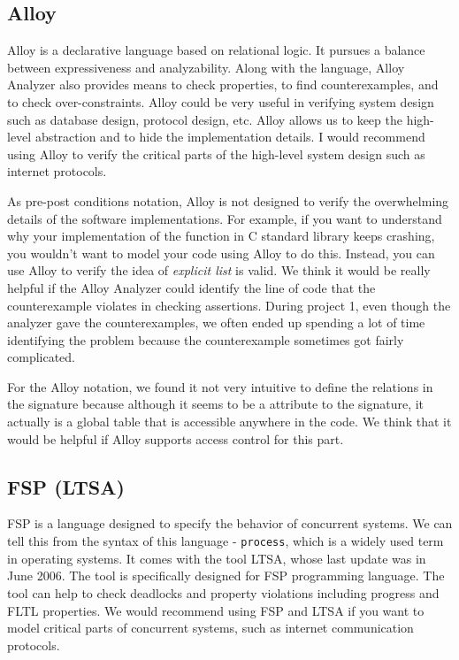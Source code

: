 \documentclass[titlepage]{article}
\begin{document}
\subsection{Alloy}
Alloy is a declarative language based on relational logic. It pursues a balance between expressiveness and analyzability. Along with the language, Alloy Analyzer also provides means to check properties, to find counterexamples, and to check over-constraints. Alloy could be very useful in verifying system design such as database design, protocol design, etc. Alloy allows us to keep the high-level abstraction and to hide the implementation details. I would recommend using Alloy to verify the critical parts of the high-level system design such as internet protocols.

As pre-post conditions notation, Alloy is not designed to verify the overwhelming details of the software implementations. For example, if you want to understand why your implementation of the  function in C standard library keeps crashing, you wouldn't want to model your code using Alloy to do this. Instead, you can use Alloy to verify the idea of \textit{explicit list} is valid. We think it would be really helpful if the Alloy Analyzer could identify the line of code that the counterexample violates in checking assertions. During project 1, even though the analyzer gave the counterexamples, we often ended up spending a lot of time identifying the problem because the counterexample sometimes got fairly complicated.

For the Alloy notation, we found it not very intuitive to define the relations in the signature because although it seems to be a attribute to the signature, it actually is a global table that is accessible anywhere in the code. We think that it would be helpful if Alloy supports access control for this part.

\subsection{FSP (LTSA)}

FSP is a language designed to specify the behavior of concurrent systems. We can tell this from the syntax of this language - \texttt{process}, which is a widely used term in operating systems. It comes with the tool LTSA, whose last update was in June 2006. The tool is specifically designed for FSP programming language. The tool can help to check deadlocks and property violations including progress and FLTL properties. We would recommend using FSP and LTSA if you want to model critical parts of concurrent systems, such as internet communication protocols.
\end{document}
